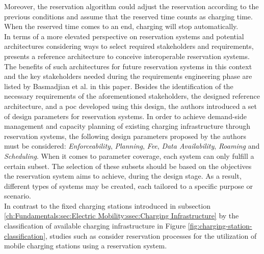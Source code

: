 Moreover, the reservation algorithm could adjust the reservation according to the previous conditions and assume that the reserved time counts as charging time. When the reserved time comes to an end, charging will stop automatically. \\
\noindent In terms of a more elevated perspective on reservation systems and potential architectures considering ways to select required stakeholders and requirements, \cite{basmadjian_reference_2020} presents a reference architecture to conceive interoperable reservation systems.
The benefits of such architectures for future reservation systems in this context and the key stakeholders needed during the requirements engineering phase are listed by Basmadjian et al. in this paper.
Besides the identification of the necessary requirements of the aforementioned stakeholders, the designed reference architecture, and a \acrshort{poc} developed using this design, the authors introduced a set of design parameters for reservation systems.
In order to achieve demand-side management and capacity planning of existing charging infrastructure through reservation systems, the following design parameters proposed by the authors must be considered: \textit{Enforceability}, \textit{Planning}, \textit{Fee}, \textit{Data Availability}, \textit{Roaming} and \textit{Scheduling}.
When it comes to parameter coverage, each system can only fulfill a certain subset. The selection of these subsets should be based on the objectives the reservation system aims to achieve, during the design stage.
As a result, different types of systems may be created, each tailored to a specific purpose or scenario. \\
\noindent In contrast to the fixed charging stations introduced in subsection \ref{ch:Fundamentals:sec:Electric Mobility:ssec:Charging Infrastructure} by the classification of available charging infrastructure in Figure \ref{fig:charging-station-classification}, studies such as \cite{zhang_mobile_2020} consider reservation processes for the utilization of mobile charging stations using a reservation system.
